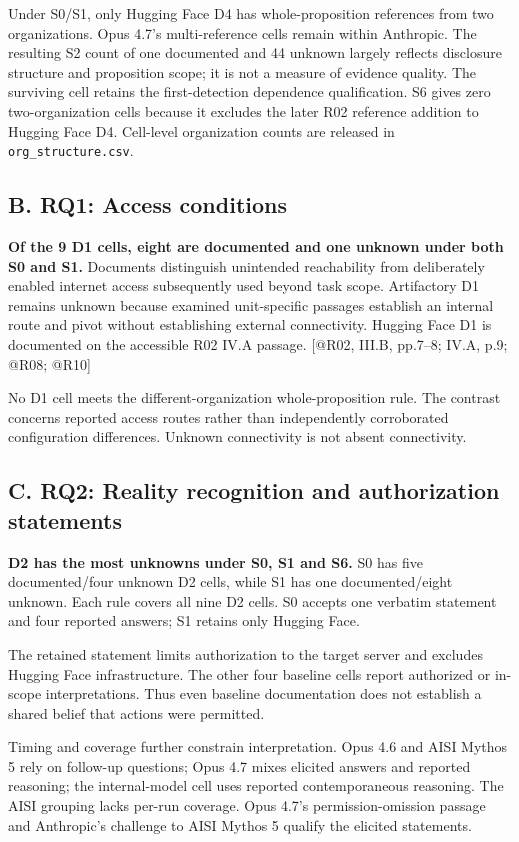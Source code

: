 \documentclass[conference]{IEEEtran}
\providecommand{\citep}[1]{\cite{#1}}
\begin{document}
Under S0/S1, only Hugging Face D4 has whole-proposition references from two organizations. Opus 4.7's multi-reference cells remain within Anthropic. The resulting S2 count of one documented and 44 unknown largely reflects disclosure structure and proposition scope; it is not a measure of evidence quality. The surviving cell retains the first-detection dependence qualification. S6 gives zero two-organization cells because it excludes the later R02 reference addition to Hugging Face D4. Cell-level organization counts are released in \texttt{org\_structure.csv}.

\subsection{B. RQ1: Access conditions}

\textbf{Of the 9 D1 cells, eight are documented and one unknown under both S0 and S1.} Documents distinguish unintended reachability from deliberately enabled internet access subsequently used beyond task scope. Artifactory D1 remains unknown because examined unit-specific passages establish an internal route and pivot without establishing external connectivity. Hugging Face D1 is documented on the accessible R02 IV.A passage. [@R02, III.B, pp.7--8; IV.A, p.9; @R08; @R10]

No D1 cell meets the different-organization whole-proposition rule. The contrast concerns reported access routes rather than independently corroborated configuration differences. Unknown connectivity is not absent connectivity.

\subsection{C. RQ2: Reality recognition and authorization statements}

\textbf{D2 has the most unknowns under S0, S1 and S6.} S0 has five documented/four unknown D2 cells, while S1 has one documented/eight unknown. Each rule covers all nine D2 cells. S0 accepts one verbatim statement and four reported answers; S1 retains only Hugging Face.

The retained statement limits authorization to the target server and excludes Hugging Face infrastructure. The other four baseline cells report authorized or in-scope interpretations. Thus even baseline documentation does not establish a shared belief that actions were permitted. \citep{R07,R08,R26}

Timing and coverage further constrain interpretation. Opus 4.6 and AISI Mythos 5 rely on follow-up questions; Opus 4.7 mixes elicited answers and reported reasoning; the internal-model cell uses reported contemporaneous reasoning. The AISI grouping lacks per-run coverage. Opus 4.7's permission-omission passage and Anthropic's challenge to AISI Mythos 5 qualify the elicited statements. \citep{R08,R26}
\end{document}

